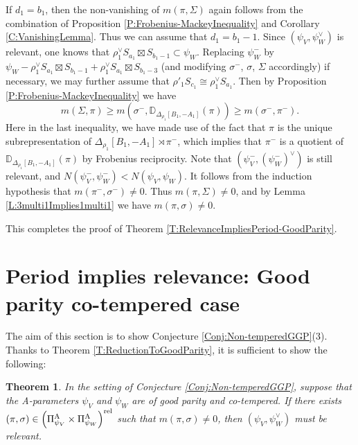 \documentclass[11pt,letterpaper]{amsart}
\theoremstyle{plain}
\newcounter{theorem}[section]
\numberwithin{theorem}{section}
\numberwithin{equation}{subsection}
\newtheorem{Thm}[theorem]{Theorem}
\theoremstyle{remark}
\newcommand{\D}{\mathbb{D}}
\def\AP{\Pi^{\rm A}} %
\def\rel{{\rm rel}} %
\begin{document}
If $d_1=b_1$, then the non-vanishing of $m\left(\pi,\Sigma\right)$ again follows from the combination of Proposition \ref{P:Frobenius-MackeyInequality} and Corollary \ref{C:VanishingLemma}. Thus we can assume that $d_1=b_1-1$. Since $\left(\psi_V,\psi_W^\vee\right)$ is relevant, one knows that $\rho_1^\vee S_{a_1}\boxtimes S_{b_1-1}\subset \psi_W$. Replacing $\psi_W^-$ by $\psi_W-\rho_1^\vee S_{a_1}\boxtimes S_{b_1-1} + \rho_1^\vee S_{a_1}\boxtimes S_{b_1-3}$ (and modifying $\sigma^-$, $\sigma$, $\Sigma$ accordingly) if necessary, we may further assume that $\rho'_1 S_{c_1}\cong\rho_1^\vee S_{a_1}$. Then by Proposition \ref{P:Frobenius-MackeyInequality} we have
\[
    m\left(\Sigma,\pi\right) \geq m\left(\sigma^-,\D_{\Delta_{\rho_1}\left[B_1,-A_1\right]}\left(\pi\right)\right)\geq m\left(\sigma^-,\pi^-\right).
\]
Here in the last inequality, we have made use of the fact that $\pi$ is the unique subrepresentation of $\Delta_{\rho_1}\left[B_1,-A_1\right]\rtimes\pi^-$, which implies that $\pi^-$ is a quotient of $\D_{\Delta_{\rho_1}\left[B_1,-A_1\right]}\left(\pi\right)$ by Frobenius reciprocity. Note that $\left(\psi_V^-,\left(\psi_W^-\right)^\vee\right)$ is still relevant, and $N\left(\psi_V^-,\psi_W^-\right)<N\left(\psi_V,\psi_W\right)$. It follows from the induction hypothesis that $m\left(\pi^-,\sigma^-\right)\neq 0$. Thus $m\left(\pi,\Sigma\right)\neq 0$, and by Lemma \ref{L:3multi1Implies1multi1} we have $m\left(\pi,\sigma\right)\neq 0$.

\vskip 5pt

This completes the proof of Theorem \ref{T:RelevanceImpliesPeriod-GoodParity}.


\vskip 10pt

\section{Period implies relevance: Good parity co-tempered case}\label{sec:period_implies_relevance}

The aim of this section is to show Conjecture \ref{Conj:Non-temperedGGP}(3). Thanks to Theorem \ref{T:ReductionToGoodParity}, it is sufficient to show the following:

\begin{Thm}\label{T:PeriodImpliesRelevanceGPCotempered}
In the setting of Conjecture \ref{Conj:Non-temperedGGP}, suppose that the A-parameters $\psi_V$ and $\psi_W$ are of good parity and co-tempered. If there exists $\left(\pi,\sigma\right)\in\left(\AP_{{\psi_V}}\times \AP_{{\psi_W}}\right)^\rel$ such that $m\left(\pi,\sigma\right)\neq 0$, then $\left(\psi_V,\psi_W^\vee\right)$ must be relevant.
\end{Thm}
\end{document}
